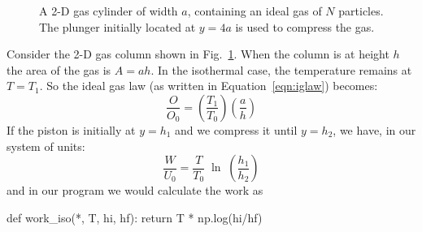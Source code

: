 \documentclass[12pt]{article}
\begin{document}
\begin{figure}
\centering
{}
\caption{A 2-D gas cylinder of width $a$, containing an ideal gas of
  $N$ particles.  The plunger initially located at $y=4a$ is used to
  compress the gas.}
\label{fig:cgas}
\end{figure}


Consider the 2-D gas column shown in Fig.~\ref{fig:cgas}.  When the
column is at height $h$ the area of the gas is $A = a h$.  In the
isothermal case, the temperature remains at $T=T_1$.  So the ideal gas
law (as written in Equation~\ref{eqn:iglaw}) becomes:
\begin{equation}
\label{eqn:oiso}
\frac{O}{O_0} = \left( \frac{T_1}{T_0} \right) \left( \frac{a}{h} \right) 
\end{equation}
If the piston is initially at $y=h_1$ and we compress it until $y=h_2$, we have, in our system of units:
\begin{equation}
\label{eqn:wiso}
\frac{W}{U_0} = \frac{T}{T_0} \; \ln \; \left( \frac{h_1}{h_2}\right)
\end{equation}
and in our program we would calculate the work as
\begin{python}
def work_iso(*, T, hi, hf):
     return T * np.log(hi/hf)
\end{python}
\end{document}
